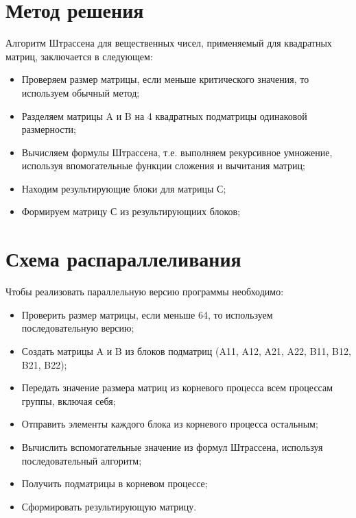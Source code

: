 \documentclass{report}
\begin{document}
\section*{Метод решения}
Алгоритм Штрассена для вещественных чисел, применяемый для квадратных матриц, заключается в следующем:
\begin{itemize}
    \item Проверяем размер матрицы, если меньше критического значения, то используем обычный метод;
    \item Разделяем матрицы A и B на 4 квадратных подматрицы одинаковой размерности;
    \item Вычисляем формулы Штрассена, т.е. выполняем рекурсивное умножение, используя впомогательные функции сложения и вычитания матриц;
    \item Находим результирующие блоки для матрицы С;
    \item Формируем матрицу С из результирующиих блоков;
\end{itemize}
\newpage

\section*{Схема распараллеливания}
Чтобы реализовать параллельную версию программы необходимо:
\begin{itemize}
    \item Проверить размер матрицы, если меньше 64, то используем последовательную версию;
    \item Создать матрицы A и B из блоков подматриц (A11, A12, A21, A22, B11, B12, B21, B22);
    \item Передать значение размера матриц из корневого процесса всем процессам группы, включая себя;
    \item Отправить элементы каждого блока из корневого процесса остальным;
    \item Вычислить вспомогательные значение из формул Штрассена, используя последовательный алгоритм;
    \item Получить подматрицы в корневом процессе;
    \item Сформировать результирующую матрицу.
\end{itemize}
\newpage

\end{document}
